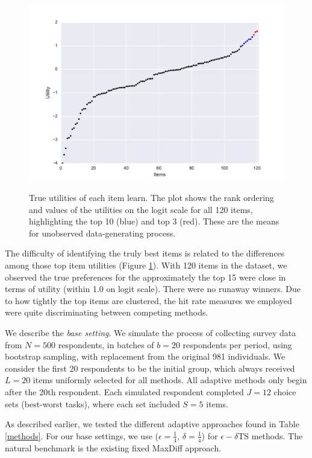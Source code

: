 \documentclass[nonblindrev]{informs3}
\begin{document}
\begin{figure}[!ht]
\caption{True utilities of each item learn. The plot shows the rank ordering and values of the utilities on the logit scale for all 120 items, highlighting the top 10 (blue) and top 3 (red). These are the means for unobserved data-generating process.}
\includegraphics[width=1\textwidth]{plots/utilscore.pdf}
\label{fig:util} 
\end{figure}

The difficulty of identifying the truly best items is related to the differences among those top item utilities (Figure \ref{fig:util}). With 120 items in the dataset, we observed the true preferences for the approximately the top 15 were close in terms of utility (within 1.0 on logit scale). There were no runaway winners. Due to how tightly the top items are clustered, the hit rate measures we employed were quite discriminating between competing methods.

We describe the \emph{base setting}. We simulate the process of collecting survey data from $N=500$ respondents, in batches of $b=20$ respondents per period, using bootstrap sampling, with replacement from the original 981 individuals. We consider the first 20 respondents to be the initial group, which always received $L=20$ items uniformly selected for all methods. All adaptive methods only begin after the 20th respondent. Each simulated respondent completed $J=12$ choice sets (best-worst tasks), where each set included $S=5$ items.

As described earlier, we tested the different adaptive approaches found in Table \ref{methods}. For our base settings, we use ($\epsilon=\frac{1}{4}$, $\delta=\frac{1}{4}$) for $\epsilon-\delta$TS methods. The natural benchmark is the existing fixed MaxDiff approach.
\end{document}
